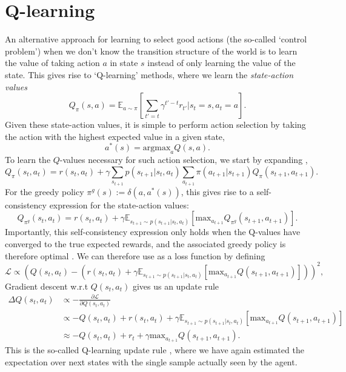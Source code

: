 \section{Q-learning}
\label{sec:q_learning}

An alternative approach for learning to select good actions (the so-called `control problem') when we don't know the transition structure of the world is to learn the value of taking action $a$ in state $s$ instead of only learning the value of the state.
This gives rise to `Q-learning' methods, where we learn the \emph{state-action values}
\begin{equation}
    \label{eq:Q-values}
    Q_\pi(s,a) =  \mathbb{E}_{a \sim \pi} \left [ \sum_{t'=t} \gamma^{t' - t} r_{t'} | s_{t} = s, a_{t} = a \right ].
\end{equation}
Given these state-action values, it is simple to perform action selection by taking the action with the highest expected value in a given state,
\begin{equation}
    a^*(s) = \text{argmax}_{a} Q(s, a).
\end{equation}
To learn the $Q$-values necessary for such action selection, we start by expanding ,
\begin{equation}
    \label{eq:Q-expanded}
    Q_\pi(s_t,a_t) =  r(s_t, a_t) + \gamma \sum_{s_{t+1}} p(s_{t+1} | s_t, a_t) \sum_{a_{t+1}} \pi(a_{t+1} | s_{t+1}) Q_\pi(s_{t+1}, a_{t+1}).
\end{equation}
For the greedy policy $\pi^g(s) := \delta(a, a^*(s))$, this gives rise to a self-consistency expression for the state-action values:
\begin{equation}
    \label{eq:Q-optimal}
    Q_{\pi^g}(s_t,a_t) =  r(s_t, a_t) + \gamma \mathbb{E}_{s_{t+1} \sim p(s_{t+1} | s_t, a_t)} \left [ \text{max}_{a_{t+1}} Q_{\pi^g}(s_{t+1}, a_{t+1}) \right ].
\end{equation}
Importantly, this self-consistency expression only holds when the Q-values have converged to the true expected rewards, and the associated greedy policy is therefore optimal \citep{sutton2018reinforcement}.
We can therefore use  as a loss function by defining
\begin{equation}
    \mathcal{L} \propto \left (  Q(s_t,a_t) - (r(s_t, a_t) + \gamma \mathbb{E}_{s_{t+1} \sim p(s_{t+1} | s_t, a_t)} \left [ \text{max}_{a_{t+1}} Q(s_{t+1}, a_{t+1}) \right ] ) \right )^2,
\end{equation}
Gradient descent w.r.t $Q(s_t,a_t)$ gives us an update rule
\begin{align}
    \Delta  Q(s_t,a_t) & \propto - \frac{\partial \mathcal{L}}{\partial  Q(s_t,a_t)}\\
    &\propto - Q(s_t,a_t) + r(s_t, a_t) + \gamma \mathbb{E}_{s_{t+1} \sim p(s_{t+1} | s_t, a_t)} \left [ \text{max}_{a_{t+1}} Q(s_{t+1}, a_{t+1}) \right ] \\
    &\approx - Q(s_t,a_t) + r_t + \gamma \text{max}_{a_{t+1}} Q(s_{t+1}, a_{t+1}).
\end{align}
This is the so-called Q-learning update rule \citep{watkins1989learning}, where we have again estimated the expectation over next states with the single sample actually seen by the agent.

